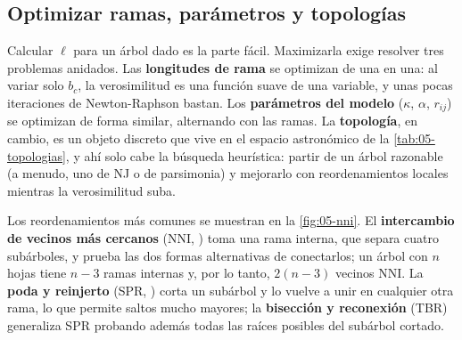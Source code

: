 \subsection{Optimizar ramas, parámetros y topologías}

Calcular $\ell$ para un árbol dado es la parte fácil. Maximizarla exige resolver tres problemas anidados. Las \textbf{longitudes de rama} se optimizan de una en una: al variar solo $b_c$, la verosimilitud es una función suave de una variable, y unas pocas iteraciones de Newton-Raphson bastan. Los \textbf{parámetros del modelo} ($\kappa$, $\alpha$, $r_{ij}$) se optimizan de forma similar, alternando con las ramas. La \textbf{topología}, en cambio, es un objeto discreto que vive en el espacio astronómico de la \cref{tab:05-topologias}, y ahí solo cabe la búsqueda heurística: partir de un árbol razonable (a menudo, uno de NJ o de parsimonia) y mejorarlo con reordenamientos locales mientras la verosimilitud suba.

Los reordenamientos más comunes se muestran en la \cref{fig:05-nni}. El \textbf{intercambio de vecinos más cercanos} (NNI, ) toma una rama interna, que separa cuatro subárboles, y prueba las dos formas alternativas de conectarlos; un árbol con $n$ hojas tiene $n-3$ ramas internas y, por lo tanto, $2(n-3)$ vecinos NNI. La \textbf{poda y reinjerto} (SPR, ) corta un subárbol y lo vuelve a unir en cualquier otra rama, lo que permite saltos mucho mayores; la \textbf{bisección y reconexión} (TBR) generaliza SPR probando además todas las raíces posibles del subárbol cortado.

